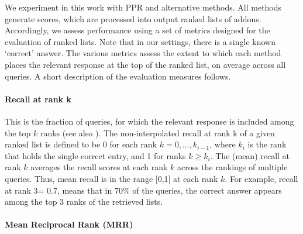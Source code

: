 \documentclass[11pt,oneside]{book}
\begin{document}

We experiment in this work with PPR and alternative methods. All methods generate scores, which are processed into output ranked lists of addons. Accordingly, we assess performance using a set of metrics designed for the evaluation of ranked lists. Note that in our settings, there is a single known `correct' answer. The various metrics assess the extent to which each method places the relevant response at the top of the ranked list, on average across all queries. A short description of the evaluation measures follows.

\paragraph{Recall at rank k}
This is the fraction of queries, for which the relevant response is included among the top $k$ ranks (see also \citep{minkov2010improving}). The non-interpolated recall at rank k of a given ranked list is defined to be 0 for each rank $k = 0, ..., k_{i−1}$, where $k_i$ is the rank that holds the single correct entry, and 1 for ranks $k\geq k_i$. The (mean) recall at rank $k$ averages the recall
scores at each rank $k$ across the rankings of multiple queries. Thus, mean recall is in the range [0,1] at each rank $k$. For example, recall at rank
3= 0.7, means that in 70\% of the queries, the correct answer appears among the
top 3 ranks of the retrieved lists.

\paragraph{Mean Reciprocal Rank (MRR)}
\end{document}
